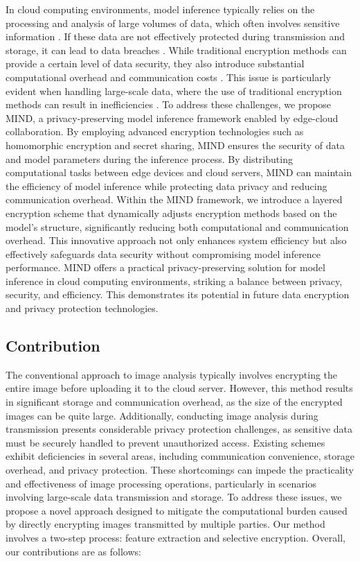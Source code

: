 \documentclass[conference]{IEEEtran}
\begin{document}
In cloud computing environments, model inference typically relies on the processing and analysis of large volumes of data, which often involves sensitive information \cite{fu2020vfl}. If these data are not effectively protected during transmission and storage, it can lead to data breaches \cite{yang2012efficient}. While traditional encryption methods can provide a certain level of data security, they also introduce substantial computational overhead and communication costs \cite{kerschbaum2012outsourced}. This issue is particularly evident when handling large-scale data, where the use of traditional encryption methods can result in inefficiencies \cite{li2015encdb}. To address these challenges, we propose MIND, a privacy-preserving model inference framework enabled by edge-cloud collaboration. By employing advanced encryption technologies such as homomorphic encryption and secret sharing, MIND ensures the security of data and model parameters during the inference process. By distributing computational tasks between edge devices and cloud servers, MIND can maintain the efficiency of model inference while protecting data privacy and reducing communication overhead. Within the MIND framework, we introduce a layered encryption scheme that dynamically adjusts encryption methods based on the model's structure, significantly reducing both computational and communication overhead. This innovative approach not only enhances system efficiency but also effectively safeguards data security without compromising model inference performance. MIND offers a practical privacy-preserving solution for model inference in cloud computing environments, striking a balance between privacy, security, and efficiency. This demonstrates its potential in future data encryption and privacy protection technologies.

\subsection{Contribution}

The conventional approach to image analysis typically involves encrypting the entire image before uploading it to the cloud server. However, this method results in significant storage and communication overhead, as the size of the encrypted images can be quite large. Additionally, conducting image analysis during transmission presents considerable privacy protection challenges, as sensitive data must be securely handled to prevent unauthorized access. Existing schemes exhibit deficiencies in several areas, including communication convenience, storage overhead, and privacy protection. These shortcomings can impede the practicality and effectiveness of image processing operations, particularly in scenarios involving large-scale data transmission and storage. To address these issues, we propose a novel approach designed to mitigate the computational burden caused by directly encrypting images transmitted by multiple parties. Our method involves a two-step process: feature extraction and selective encryption. Overall, our contributions are as follows:
\end{document}
